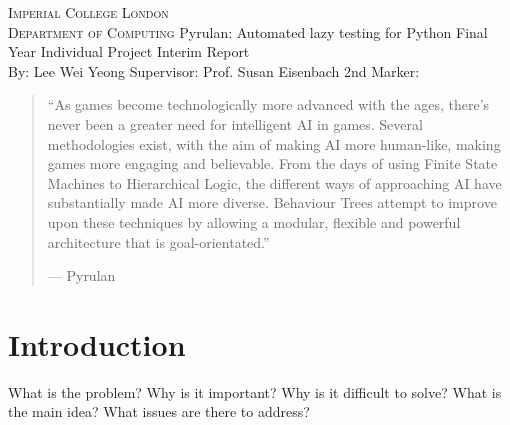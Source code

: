 \documentclass{icldt}
\def \supervisor {Prof. Susan Eisenbach}
\def \secondmarker {}
\begin{document}
\begin{titlepage}
\begin{center}
\textsc{\Large Imperial College London\\Department of Computing}
\vfil
{\huge Pyrulan:}\linebreak \linebreak
{\huge Automated lazy testing for Python}
\vfil
{\Large Final Year Individual Project}\linebreak \linebreak
{\Large Interim Report}\\[1cm]
{\large By: Lee Wei Yeong }
\vfil
{\Large Supervisor: \supervisor} \linebreak \linebreak
{\Large 2nd Marker: \secondmarker}
\vfil
{\large \monthname\ \number\year}
\end{center}
\end{titlepage}
\begin{abstract}
\textbf{}

``As games become technologically more advanced with the ages, there's never been a greater need for intelligent AI in games. Several methodologies exist, with the aim of making AI more human-like, making games more engaging and believable. From the days of using Finite State Machines to Hierarchical Logic, the different ways of approaching AI have substantially made AI more diverse. Behaviour Trees attempt to improve upon these techniques by allowing a modular, flexible and powerful architecture that is goal-orientated.''

\hfill --- Pyrulan
\end{abstract}

\tableofcontents
\chapter{Introduction}

What is the problem? Why is it important? Why is it difficult to solve? What is the main idea? What issues are there to address?
\end{document}
